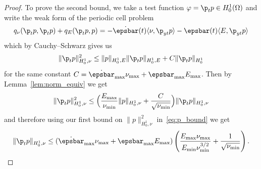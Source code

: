 \documentclass[letterpaper,11pt]{article}
\begin{document}
\begin{proof}
    To prove the second bound, we take a test function $\varphi = \p_tp \in H_0^1(\Omega)$ and write the weak form of the periodic cell problem
    \begin{equation}
        q_\nu(\p_tp, \p_tp) + q_E(\p_tp, p) = -\dot{\epsbar}(t)\langle\nu, \p_{yt}p\rangle - \epsbar(t)\langle E, \p_{yt}p\rangle
    \end{equation}
    which by Cauchy--Schwarz gives us
    \begin{align*}
        \|\p_tp\|_{H_0^1, \nu}^2 \leq \|p\|_{H_0^1, E}\|\p_tp\|_{H_0^1, E} + C\|\p_tp\|_{H_0^1}
    \end{align*}
    for the same constant $C = \dot{\epsbar}_{\max}\nu_{\max} + \epsbar_{\max}E_{\max}$. Then by Lemma~\ref{lem:norm_equiv} we get
    \begin{align*}
        \|\p_tp\|_{H_0^1, \nu}^2 \leq \Big(\frac{E_{\max}}{\nu_{\min}}\|p\|_{H_0^1, \nu} + \frac{C}{\sqrt{\nu_{\min}}}\Big)\|\p_tp\|_{H_0^1, \nu}
    \end{align*}
    and therefore using our first bound on $\|p\|_{H_0^1, \nu}^2$ in~\eqref{eq:p_bound} we get
    \begin{equation*}
        \|\p_tp\|_{H_0^1, \nu} \leq (\dot{\epsbar}_{\max}\nu_{\max} + \epsbar_{\max}E_{\max})\left(\frac{E_{\max}\nu_{\max}}{E_{\min}\nu_{\min}^{3/2}} + \frac{1}{\sqrt{\nu_{\min}}}\right).
    \end{equation*}
\end{proof}
\end{document}
